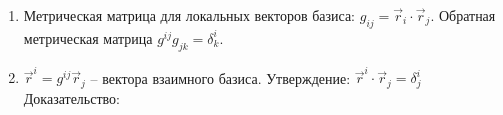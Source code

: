 \begin{enumerate}
  \item Метрическая матрица для локальных векторов базиса: $g_{ij} = \vec{r}_i \cdot \vec{r}_j$. 
    Обратная метрическая матрица $g^{ij} g_{jk} = \delta^i_k$.

  \item $\vec{r}^i = g^{ij} \vec{r}_j$ -- вектора взаимного базиса.
    Утверждение: $\vec{r}^i \cdot \vec{r}_j = \delta^i_j$
    Доказательство: 
\end{enumerate}

